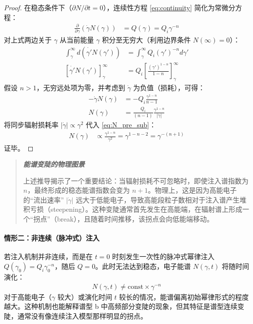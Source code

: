 \documentclass[12pt,oneside]{ctexart}
\theoremstyle{definition}
\theoremstyle{plain}
\theoremstyle{remark}
\newif\ifshowderiv
\newcommand{\derivdefaulttitle}{额外说明}
\newenvironment{derivationnote}[1][\derivdefaulttitle]{%
  \ifshowderiv\begin{quote}\small\itshape
  \noindent\textbf{#1}\;\par
}{%
  \end{quote}\fi
}
\begin{document}
\begin{proof}
在稳态条件下（$\partial N / \partial t = 0$），连续性方程 \eqref{eq:continuity} 简化为常微分方程：
\begin{align}
\frac{\partial}{\partial \gamma} \left( \dot{\gamma} N(\gamma) \right) &= Q(\gamma) = Q_i \gamma^{-n}
\end{align}
对上式两边关于 $\gamma$ 从当前能量 $\gamma$ 积分至无穷大（利用边界条件 $N(\infty)=0$）：
\begin{align}
\int_{\gamma}^{\infty} d \left( \dot{\gamma'} N(\gamma') \right) &= \int_{\gamma}^{\infty} Q_i (\gamma')^{-n} d\gamma' \\
\left[ \dot{\gamma'} N(\gamma') \right]_{\gamma}^{\infty} &= Q_i \left[ \frac{(\gamma')^{1-n}}{1-n} \right]_{\gamma}^{\infty}
\end{align}
假设 $n > 1$，无穷远处项为零，并考虑到 $\dot{\gamma}$ 为负值（损耗），可得：
\begin{align}
- \dot{\gamma} N(\gamma) &= - Q_i \frac{\gamma^{1-n}}{n-1} \\
N(\gamma) &= \frac{Q_i}{(n-1)} \frac{\gamma^{1-n}}{|\dot{\gamma}|} \label{eq:N_pre_sub}
\end{align}
将同步辐射损耗率 $|\dot{\gamma}| \propto \gamma^2$ 代入 \eqref{eq:N_pre_sub}：
\begin{align}
N(\gamma) &\propto \frac{\gamma^{1-n}}{\gamma^2} = \gamma^{1-n-2} = \gamma^{-(n+1)}
\end{align}
证毕。
\end{proof}

\begin{derivationnote}[能谱变陡的物理图景]
上述推导揭示了一个重要结论：当辐射损耗不可忽略时，即使注入谱指数为 $n$，最终形成的稳态能谱指数会变为 $n+1$。物理上，这是因为高能电子的“流出速率” $|\dot{\gamma}|$ 远大于低能电子，导致高能段粒子数相对于注入谱产生堆积亏损（steepening）。这种变陡通常首先发生在高能端，在辐射谱上形成一个“拐点”（break），且随着时间推移，该拐点会向低能端移动。
\end{derivationnote}

\paragraph{情形二：非连续（脉冲式）注入}

若注入机制并非连续，而是在 $t=0$ 时刻发生一次性的脉冲式幂律注入 $Q(\gamma_0) = Q_i \gamma_0^{-n}$，随后 $Q=0$。此时无法达到稳态，电子能谱 $N(\gamma, t)$ 将随时间演化：
\begin{align}
N(\gamma, t) \neq \text{const} \times \gamma^{-n}
\end{align}
对于高能电子（$\gamma$ 较大）或演化时间 $t$ 较长的情况，能谱偏离初始幂律形式的程度越大。这种机制也能解释谱型 b 中高频部分变陡的现象，但其特征是谱型连续变陡，通常没有像连续注入模型那样明显的拐点。
\end{document}

